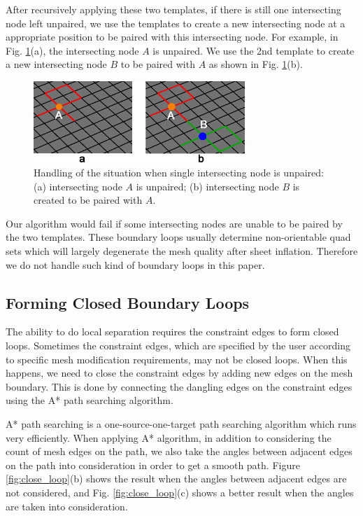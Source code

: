 \documentclass[final,5p,times,twocolumn]{elsarticle}
\begin{document}
After recursively applying these two templates, if there is still one intersecting node left unpaired, we use the templates to create a new intersecting node at a appropriate position to be paired with this intersecting node. For example, in Fig. \ref{fig:one_int_pt_left}(a), the intersecting node $A$ is unpaired. We use the 2nd template to create a new intersecting node $B$ to be paired with $A$ as shown in Fig. \ref{fig:one_int_pt_left}(b).

\begin{figure}[htbp]
\begin{center}
\includegraphics[width=8cm]{figures/one_int_pt_left.png}
\caption{Handling of the situation when single intersecting node is unpaired: (a) intersecting node $A$ is unpaired; (b) intersecting node $B$ is created to be paired with $A$.}
\label{fig:one_int_pt_left}
\end{center}
\end{figure}

Our algorithm would fail if some intersecting nodes are unable to be paired by the two templates. These boundary loops usually determine non-orientable quad sets\cite{Suzuki:2010hn} which will largely degenerate the mesh quality after sheet inflation. Therefore we do not handle such kind of boundary loops in this paper.

\subsection{Forming Closed Boundary Loops}
\label{sec:close_bound_loop}
The ability to do local separation requires the constraint edges to form closed loops. Sometimes the constraint edges, which are specified by the user according to specific mesh modification requirements, may not be closed loops. When this happens, we need to close the constraint edges by adding new edges on the mesh boundary. This is done by connecting the dangling edges on the constraint edges using the A* path searching algorithm.

A* path searching is a one-source-one-target path searching algorithm which runs very efficiently. When applying A* algorithm, in addition to considering the count of mesh edges on the path, we also take the angles between adjacent edges on the path into consideration in order to get a smooth path. Figure \ref{fig:close_loop}(b) shows the result when the angles between adjacent edges are not considered, and Fig. \ref{fig:close_loop}(c) shows a better result when the angles are taken into consideration.
\end{document}
